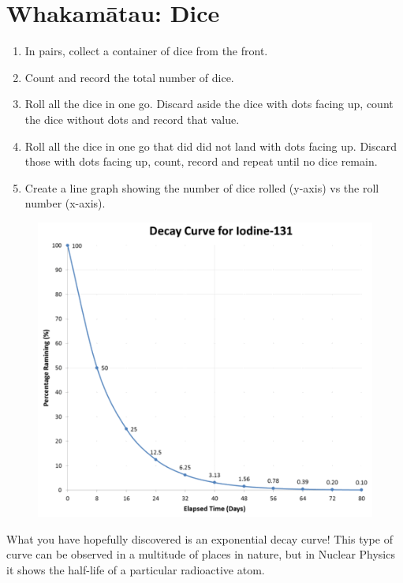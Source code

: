 \documentclass[12pt]{report}
\begin{document}
{\section{Whakamātau: Dice}
\begin{enumerate}
	\item In pairs, collect a container of dice from the front.
	\item Count and record the total number of dice.
	\item Roll all the dice in one go. Discard aside the dice with dots facing up, count the dice without dots and record that value.
	\item Roll all the dice in one go that did did not land with dots facing up. Discard those with dots facing up, count, record and repeat until no dice remain.
	\item Create a line graph showing the number of dice rolled (y-axis) vs the roll number (x-axis).
\end{enumerate}

\vspace{5cm}

\begin{figure}
	\centering
	\vspace{-1cm}
	\includegraphics[width=0.9\linewidth]{iodine-131.png}
\end{figure}

What you have hopefully discovered is an exponential decay curve! This type of curve can be observed in a multitude of places in nature, but in Nuclear Physics it shows the half-life of a particular radioactive atom.

}
\end{document}
